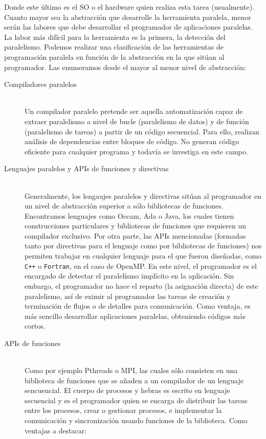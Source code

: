 Donde este último es el SO o el hardware quien realiza esta tarea (usualmente).\\

Cuanto mayor sea la abstracción que desarrolle la herramienta paralela, menor serán las labores que debe desarrollar el programador de aplicaciones paralelas. La labor más difícil para la herramienta es la primera, la detección del paralelismo. Podemos realizar una clasificación de las herramientas de programación paralela en función de la abstracción en la que sitúan al programador. Las enumeramos desde el mayor al menor nivel de abstracción:
\begin{description}
    \item [Compiladores paralelos]~\\
        Un compilador paralelo pretende ser aquella automatización capaz de extraer paralelismo a nivel de bucle (paralelismo de datos) y de función (paralelismo de tareas) a partir de un código secuencial. Para ello, realizan análisis de dependencias entre bloques de código. No generan código eficiente para cualquier programa y todavía se investiga en este campo.
    \item [Lenguajes paralelos y APIs de funciones y directivas]~\\
        Generalmente, los lengaujes paralelos y directivas sitúan al programador en un nivel de abstracción superior a sólo bibliotecas de funciones. Encontramos lenguajes como Occam, Ada o Java, los cuales tienen construcciones particulares y bibliotecas de funciones que requieren un compilador exclusivo. Por otra parte, las APIs mencionadas (formadas tanto por directivas para el lenguaje como por bibliotecas de funciones) nos permiten trabajar en cualquier lenguaje para el que fueron diseñadas, como \verb|C++| o \verb|Fortran|, en el caso de OpenMP. En este nivel, el programador es el encargado de detectar el paralelísmo implícito en la aplicación. Sin embargo, el programador no hace el reparto (la asignación directa) de este paralelismo, así de eximir al programador las tareas de creación y terminación de flujos o de detalles para comunicación. Como ventaja, es más sencillo desarrollar aplicaciones paralelas, obteniendo códigos más cortos.
    \item [APIs de funciones]~\\
        Como por ejemplo Pthreads o MPI, las cuales sólo consisten en una biblioteca de funciones que se añaden a un compilador de un lenguaje sencuencial. El cuerpo de procesos y hebras es escrito en lenguaje secuencial y es el programador quien se encarga de distribuir las tareas entre los procesos, crear o gestionar procesos, e implementar la comunicación y sincronización usando funciones de la biblioteca. Como ventajas a destacar:

\end{description}
